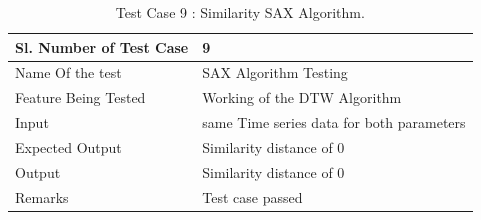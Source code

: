 \documentclass[12pt,a4paper]{report}
\begin{document}
\begin{table}
    \begin{tabular}{|l|l|}
    \hline
    Sl. Number of Test Case & 9                            \\ \hline
    Name Of the test        & SAX Algorithm Testing        \\ \hline
    Feature Being Tested    & Working of the DTW Algorithm \\ \hline
    Input                   & same Time series data for both parameters\\ \hline
    Expected Output         & Similarity distance of 0 \\ \hline
    Output                  & Similarity distance of 0 \\ \hline
    Remarks                 & Test case passed              \\ \hline
    \end{tabular}
    \caption {Test Case 9 : Similarity SAX Algorithm.}
\end{table}
\end{document}
